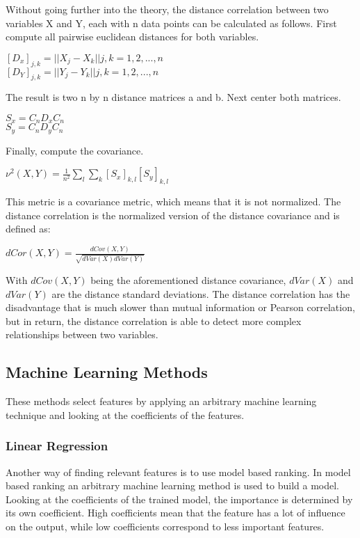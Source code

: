 Without going further into the theory, the distance correlation between two variables X and Y, each with n data points can be calculated as follows.
First compute all pairwise euclidean distances for both variables.
\begin{center}
$[D_x]_{j,k} = || X_j - X_k||   j,k = 1,2,...,n$\\
$[D_Y]_{j,k} = || Y_j - Y_k||   j,k = 1,2,...,n$\\
\end{center}
The result is two n by n distance matrices a and b. Next center both matrices.
\begin{center}
$S_x = C_nD_xC_n$\\
$S_y = C_nD_yC_n$\\
\end{center}
Finally, compute the covariance.
\begin{center}
$\nu^2(X,Y) = \frac{1}{n^2} \sum\limits_l \sum\limits_k [S_x]_{k,l}[S_y]_{k,l}$ 
\end{center}

This metric is a covariance metric, which means that it is not normalized. The distance correlation is the normalized version of the distance covariance and is defined as:

\begin{center}
$dCor(X,Y) = \frac{dCov(X,Y)}{\sqrt{dVar(X)dVar(Y)}}$
\end{center}
With $dCov(X,Y)$ being the aforementioned distance covariance, $dVar(X)$ and $dVar(Y)$ are the distance standard deviations. The distance correlation has the disadvantage that is much slower than mutual information or Pearson correlation, but in return, the distance correlation is able to detect more complex relationships between two variables.

\subsection{Machine Learning Methods}
These methods select features by applying an arbitrary machine learning technique and looking at the coefficients of the features. 

\subsubsection{Linear Regression}
Another way of finding relevant features is to use model based ranking. In model based ranking an arbitrary machine learning method is used to build a model. Looking at the coefficients of the trained model, the importance is determined by its own coefficient. High coefficients mean that the feature has a lot of influence on the output, while low coefficients correspond to less important features.


